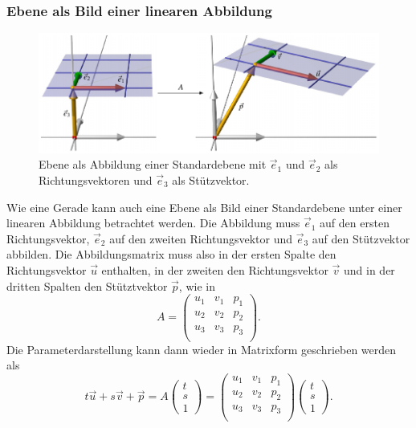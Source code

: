 \subsubsection{Ebene als Bild einer linearen Abbildung}
\begin{figure}
\centering
\includegraphics{3/images/abb.pdf}
\caption{Ebene als Abbildung einer Standardebene mit $\vec{e}_1$ und
$\vec{e}_2$ als Richtungsvektoren und $\vec{e}_3$ als Stützvektor.
\label{skript:affin:ebeneabb}}
\end{figure}
Wie eine Gerade kann auch eine Ebene als Bild einer Standardebene
unter einer linearen Abbildung betrachtet werden.
Die Abbildung muss $\vec{e}_1$ auf den ersten Richtungsvektor,
$\vec{e}_2$ auf den zweiten Richtungsvektor und $\vec{e}_3$ auf den
Stützvektor abbilden.
Die Abbildungsmatrix muss also in der ersten Spalte den Richtungsvektor
$\vec{u}$ enthalten, in der zweiten den Richtungsvektor $\vec{v}$ und in
der dritten Spalten den Stütztvektor $\vec{p}$, wie in
\[
A=\begin{pmatrix}
u_1&v_1&p_1\\
u_2&v_2&p_2\\
u_3&v_3&p_3\\
\end{pmatrix}.
\]
Die Parameterdarstellung kann dann wieder in Matrixform geschrieben werden
als
\[
t\vec{u}+s\vec{v}+\vec{p}
=
A
\begin{pmatrix}t\\s\\1\end{pmatrix}
=
\begin{pmatrix}
u_1&v_1&p_1\\
u_2&v_2&p_2\\
u_3&v_3&p_3\\
\end{pmatrix}
\begin{pmatrix}t\\s\\1\end{pmatrix}.
\]


